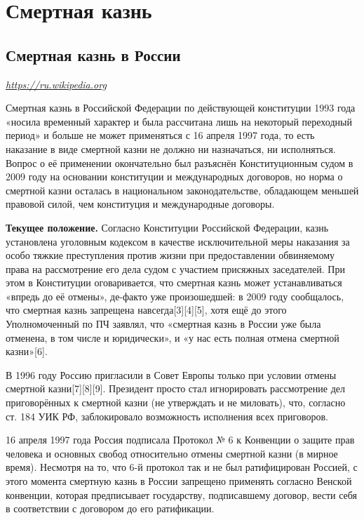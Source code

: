 \chapter{Смертная казнь}

\section{Смертная казнь в России}

 {\it \url{https://ru.wikipedia.org}}

Смертная казнь в Российской Федерации по действующей конституции 1993 года «носила временный характер и была рассчитана лишь на некоторый переходный период» и больше не может применяться с 16 апреля 1997 года, то есть наказание в виде смертной казни не должно ни назначаться, ни исполняться. Вопрос о её применении окончательно был разъяснён Конституционным судом в 2009 году на основании конституции и международных договоров, но норма о смертной казни осталась в национальном законодательстве, обладающем меньшей правовой силой, чем конституция и международные договоры.

\textbf{Текущее положение.} Согласно Конституции Российской Федерации, казнь установлена уголовным кодексом в качестве исключительной меры наказания за особо тяжкие преступления против жизни при предоставлении обвиняемому права на рассмотрение его дела судом с участием присяжных заседателей. При этом в Конституции оговаривается, что смертная казнь может устанавливаться «впредь до её отмены», де-факто уже произошедшей: в 2009 году сообщалось, что смертная казнь запрещена навсегда[3][4][5], хотя ещё до этого Уполномоченный по ПЧ заявлял, что «смертная казнь в России уже была отменена, в том числе и юридически», и «у нас есть полная отмена смертной казни»[6].

В 1996 году Россию пригласили в Совет Европы только при условии отмены смертной казни[7][8][9]. Президент просто стал игнорировать рассмотрение дел приговорённых к смертной казни (не утверждать и не миловать), что, согласно ст. 184 УИК РФ, заблокировало возможность исполнения всех приговоров.

16 апреля 1997 года Россия подписала Протокол № 6 к Конвенции о защите прав человека и основных свобод относительно отмены смертной казни (в мирное время). Несмотря на то, что 6-й протокол так и не был ратифицирован Россией, с этого момента смертную казнь в России запрещено применять согласно Венской конвенции, которая предписывает государству, подписавшему договор, вести себя в соответствии с договором до его ратификации.

